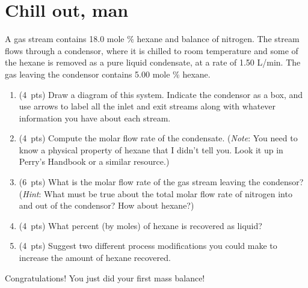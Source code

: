 \documentclass[11pt]{article}
\begin{document}
\section{Chill out, man}
\label{sec-4}
A gas stream contains 18.0 mole \% hexane and balance of nitrogen.  The stream flows through a condensor, where it is chilled to room temperature and some of the hexane is removed as a pure liquid condensate, at a rate of 1.50 L/min.  The gas leaving the condensor contains 5.00 mole \% hexane.

\begin{enumerate}
\item (4~pts) Draw a diagram of this system.  Indicate the condensor as a box, and use arrows to label all the inlet and exit streams along with whatever information you have about each stream.

\item (4~pts) Compute the molar flow rate of the condensate.  (\emph{Note}: You need to know a physical property of hexane that I didn't tell you.  Look it up in Perry's Handbook or a similar resource.)

\item (6~pts) What is the molar flow rate of the gas stream leaving the condensor?  (\emph{Hint}: What must be true about the total molar flow rate of nitrogen into and out of the condensor?  How about hexane?)

\item (4~pts) What percent (by moles) of hexane is recovered as liquid?

\item (4~pts) Suggest two different process modifications you could make to increase the amount of hexane recovered.
\end{enumerate}

\noindent Congratulations!  You just did your first mass balance!
\end{document}
